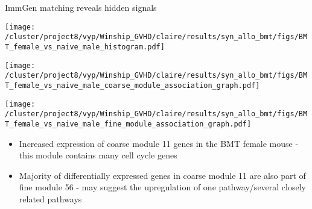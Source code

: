 \documentclass[final,hyperref={pdfpagelabels=false}]{beamer}
\begin{document}
\begin{frame}{}
\begin{columns}[t]
\begin{column}{.36\linewidth}
\begin{block}{ImmGen matching reveals hidden signals}
  
      \begin{minipage}{0.30\textwidth}
        \texttt{[image: /cluster/project8/vyp/Winship\_GVHD/claire/results/syn\_allo\_bmt/figs/BMT\_female\_vs\_naive\_male\_histogram.pdf]}
      \end{minipage}
  \hfill 
\begin{minipage}{0.30\textwidth}
        \texttt{[image: /cluster/project8/vyp/Winship\_GVHD/claire/results/syn\_allo\_bmt/figs/BMT\_female\_vs\_naive\_male\_coarse\_module\_association\_graph.pdf]}
      \end{minipage}
\hfill
\begin{minipage}{0.30\textwidth}
        \texttt{[image: /cluster/project8/vyp/Winship\_GVHD/claire/results/syn\_allo\_bmt/figs/BMT\_female\_vs\_naive\_male\_fine\_module\_association\_graph.pdf]}
      \end{minipage}
{\small \begin{itemize}
\item Increased expression of coarse module 11 genes in the BMT female mouse - this module contains many cell cycle genes
\item Majority of differentially expressed genes in coarse module 11 are also part of fine module 56 - may suggest the upregulation of one pathway/several closely related pathways 
\end{itemize}}







\end{block}
\end{column}
\end{columns}
\end{frame}
\end{document}
